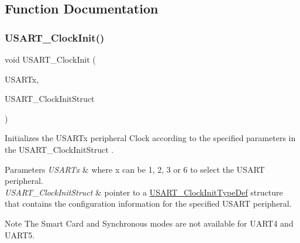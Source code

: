 \subsection{Function Documentation}
\mbox{\label{group___u_s_a_r_t___group1_gadb50c7a2175c91acd3728f8eefd0c63d}} 
\subsubsection{\texorpdfstring{U\+S\+A\+R\+T\+\_\+\+Clock\+Init()}{USART\_ClockInit()}}
{\footnotesize\ttfamily void U\+S\+A\+R\+T\+\_\+\+Clock\+Init (\begin{DoxyParamCaption}\item[{U\+S\+A\+R\+T\+\_\+\+Type\+Def $\ast$}]{U\+S\+A\+R\+Tx,  }\item[{\mbox{\hyperlink{struct_u_s_a_r_t___clock_init_type_def}{U\+S\+A\+R\+T\+\_\+\+Clock\+Init\+Type\+Def}} $\ast$}]{U\+S\+A\+R\+T\+\_\+\+Clock\+Init\+Struct }\end{DoxyParamCaption})}



Initializes the U\+S\+A\+R\+Tx peripheral Clock according to the specified parameters in the U\+S\+A\+R\+T\+\_\+\+Clock\+Init\+Struct . 


\begin{DoxyParams}{Parameters}
{\em U\+S\+A\+R\+Tx} & where x can be 1, 2, 3 or 6 to select the U\+S\+A\+RT peripheral. \\
\hline
{\em U\+S\+A\+R\+T\+\_\+\+Clock\+Init\+Struct} & pointer to a \mbox{\hyperlink{struct_u_s_a_r_t___clock_init_type_def}{U\+S\+A\+R\+T\+\_\+\+Clock\+Init\+Type\+Def}} structure that contains the configuration information for the specified U\+S\+A\+RT peripheral. \\
\hline
\end{DoxyParams}
\begin{DoxyNote}{Note}
The Smart Card and Synchronous modes are not available for U\+A\+R\+T4 and U\+A\+R\+T5. ~\newline

\end{DoxyNote}

